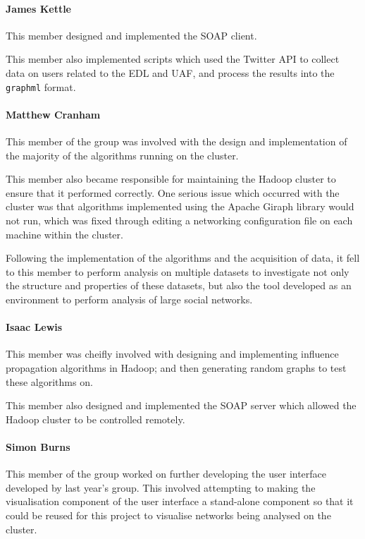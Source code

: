 \paragraph{James Kettle}
This member designed and implemented the SOAP client.

This member also implemented scripts which used the Twitter API to collect data on users related to the EDL and UAF, and process the results into the \verb/graphml/ format.

\paragraph{Matthew Cranham}
This member of the group was involved with the design and implementation of the majority of the algorithms running on the cluster. 

This member also became responsible for maintaining the Hadoop cluster to ensure that it performed correctly. One serious issue which occurred with the cluster was that algorithms implemented using the Apache Giraph library would not run, which was fixed through editing a networking configuration file on each machine within the cluster.

Following the implementation of the algorithms and the acquisition of data, it fell to this member to perform analysis on multiple datasets to investigate not only the structure and properties of these datasets, but also the tool developed as an environment to perform analysis of large social networks.

\paragraph{Isaac Lewis}
This member was cheifly involved with designing and implementing influence propagation algorithms in Hadoop; and then generating random graphs to test these algorithms on.

This member also designed and implemented the SOAP server which allowed the Hadoop cluster to be controlled remotely.

\paragraph{Simon Burns}
This member of the group worked on further developing the user interface developed by last year's group. This involved attempting to making the visualisation component of the user interface a stand-alone component so that it could be reused for this project to visualise networks being analysed on the cluster.
